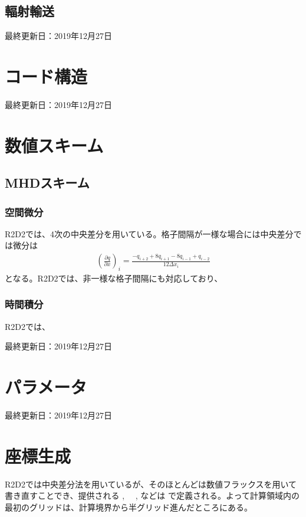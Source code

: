 \documentclass[letterpaper,10pt,dvipdfmx,report]{sphinxmanual}
\begin{document}
\section{輻射輸送}
\label{\detokenize{equation:id3}}
最終更新日：2019年12月27日


\chapter{コード構造}
\label{\detokenize{code:id1}}\label{\detokenize{code::doc}}
最終更新日：2019年12月27日


\chapter{数値スキーム}
\label{\detokenize{scheme:id1}}\label{\detokenize{scheme::doc}}

\section{MHDスキーム}
\label{\detokenize{scheme:mhd}}

\subsection{空間微分}
\label{\detokenize{scheme:id2}}
R2D2では、4次の中央差分を用いている。格子間隔が一様な場合には中央差分では微分は
\begin{equation*}
\begin{split}\left(\frac{\partial q}{\partial x}\right)_i =\frac{-q_{i+2}+8q_{i+1}-8q_{i-1}+q_{i-2}}{12\Delta x_i}\end{split}
\end{equation*}
となる。R2D2では、非一様な格子間隔にも対応しており、


\subsection{時間積分}
\label{\detokenize{scheme:id3}}
R2D2では、

最終更新日：2019年12月27日


\chapter{パラメータ}
\label{\detokenize{parameter:id1}}\label{\detokenize{parameter::doc}}
最終更新日：2019年12月27日


\chapter{座標生成}
\label{\detokenize{geometry:id1}}\label{\detokenize{geometry::doc}}
R2D2では中央差分法を用いているが、そのほとんどは数値フラックスを用いて書き直すことでき、提供される  , 　,  などは  で定義される。よって計算領域内の最初のグリッドは、計算境界から半グリッド進んだところにある。
\end{document}
